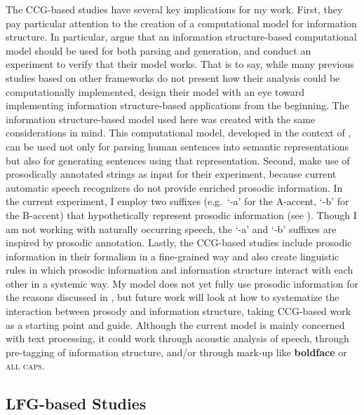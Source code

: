 The CCG-based studies have several key implications for my
work. First, they pay particular attention to the creation of a
computational model for information structure.  In particular,
\citet{traat:bos:04} argue that an information structure-based
computational model should be used for both parsing and generation,
and conduct an experiment to verify that their model works.  That is
to say, while many previous studies based on other frameworks do not
present how their analysis could be computationally implemented,
design their model with an eye toward implementing information
structure-based applications from the beginning.  The information
structure-based model used here was created with the same
considerations in mind. This computational model, developed in the
context of , can be used not only for parsing
human sentences into semantic representations but also for generating
sentences using that representation.  Second,
\citeauthor{traat:bos:04} make use of prosodically annotated strings
as input for their experiment, because current automatic speech
recognizers do not provide enriched prosodic information.  In the
current experiment, I employ two suffixes (e.g.\ `-a' for the
A-accent, `-b' for the B-accent) that hypothetically represent
prosodic information (see
 ).  Though I am not
working with naturally occurring speech, the `-a' and `-b' suffixes
are inspired by prosodic annotation.  Lastly, the CCG-based studies
include prosodic information in their formalism in a fine-grained way
and also create linguistic rules in which prosodic information and
information structure interact with each other in a systemic way.  My
model does not yet fully use prosodic information for the reasons
discussed in , but future work will
look at how to systematize the interaction between prosody and
information structure, taking CCG-based work as a starting point and
guide.  Although the current model is mainly concerned with text
processing, it could work through acoustic analysis of speech, through
pre-tagging of information structure, and/or through mark-up like
\textbf{boldface} or \textsc{all caps}.





\subsection{LFG-based Studies}
\label{8:ssec:lfg}



